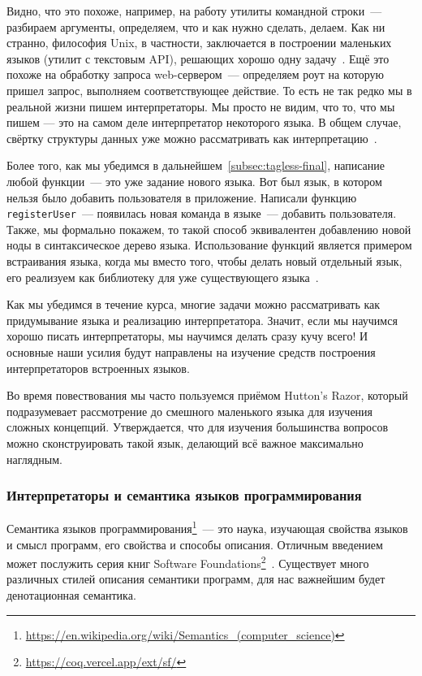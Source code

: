 Видно, что это похоже, например, на работу утилиты командной строки~--- разбираем аргументы, определяем, что и как нужно сделать, делаем.
Как ни странно, философия Unix, в частности, заключается в построении маленьких языков (утилит с текстовым API), решающих хорошо одну задачу~\cite{bentley1986little}.
Ещё это похоже на обработку запроса web-сервером~--- определяем роут на которую пришел запрос, выполняем соответствующее действие.
То есть не так редко мы в реальной жизни пишем интерпретаторы.
Мы просто не видим, что то, что мы пишем --- это на самом деле интерпретатор некоторого языка.
В общем случае, свёртку структуры данных уже можно рассматривать как интерпретацию~\cite{gibbons2014folding}.

Более того, как мы убедимся в дальнейшем~\ref{subsec:tagless-final}, написание любой функции~--- это уже задание нового языка.
Вот был язык, в котором нельзя было добавить пользователя в приложение.
Написали функцию \texttt{registerUser}~--- появилась новая команда в языке~--- добавить пользователя.
Также, мы формально покажем, то такой способ эквивалентен добавлению новой ноды в синтаксическое дерево языка.
Использование функций является примером встраивания языка, когда мы вместо того, чтобы делать новый отдельный язык, его реализуем как библиотеку для уже существующего языка~\cite{gibbons2013functional}.

Как мы убедимся в течение курса, многие задачи можно рассматривать как придумывание языка и реализацию интерпретатора.
Значит, если мы научимся хорошо писать интерпретаторы, мы научимся делать сразу кучу всего!
И основные наши усилия будут направлены на изучение средств построения интерпретаторов встроенных языков.

Во время повествования мы часто пользуемся приёмом Hutton's Razor, который подразумевает рассмотрение до смешного маленького языка для изучения сложных концепций.
Утверждается, что для изучения большинства вопросов можно сконструировать такой язык, делающий всё важное максимально наглядным.

\subsubsection{Интерпретаторы и семантика языков программирования} \label{subsec:semantics}

Семантика языков программирования\footnote{\url{https://en.wikipedia.org/wiki/Semantics_(computer_science)}\label{note:sema-wiki}}~--- это наука, изучающая свойства языков и смысл программ, его свойства и способы описания.
Отличным введением может послужить серия книг Software Foundations\footnote{\url{https://coq.vercel.app/ext/sf/}}~\cite{pierce2010software}.
Существует много различных стилей описания семантики программ, для нас важнейшим будет денотационная семантика.

